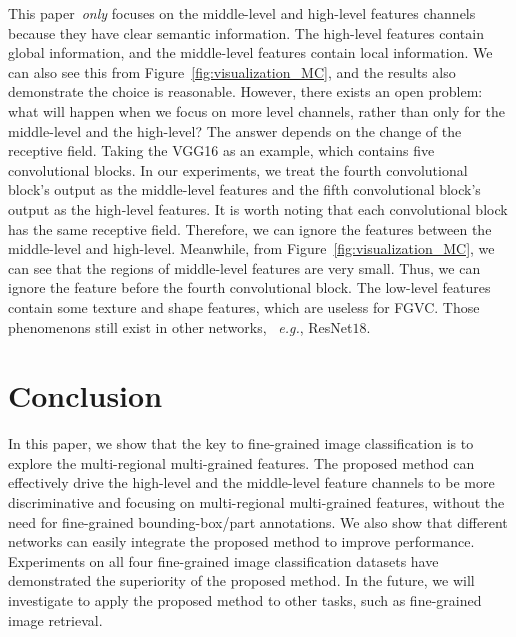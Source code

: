 \documentclass[journal]{IEEEtran}
\begin{document}
This paper~\emph{only} focuses on the middle-level and high-level features channels because they have clear semantic information. The high-level features contain global information, and the middle-level features contain local information. We can also see this from Figure~\ref{fig:visualization_MC}, and the results also demonstrate the choice is reasonable.  However, there exists an open problem: what will happen when we focus on more level channels, rather than only for the middle-level and the high-level? The answer depends on the change of the receptive field. Taking the VGG16 as an example, which contains five convolutional blocks. In our experiments, we treat the fourth convolutional block's output as the middle-level features and the fifth convolutional block's output as the high-level features. It is worth noting that each convolutional block has the same receptive field. Therefore, we can ignore the features between the middle-level and high-level. Meanwhile, from Figure~\ref{fig:visualization_MC}, we can see that the regions of middle-level features are very small. Thus, we can ignore the feature before the fourth convolutional block. The low-level features contain some texture and shape features, which are useless for FGVC. Those phenomenons still exist in other networks, ~\emph{e.g.}, ResNet$18$.

\section{Conclusion}
In this paper, we show that the key to fine-grained image classification is to explore the multi-regional multi-grained features. The proposed method can effectively drive the high-level and the middle-level feature channels to be more discriminative and focusing on multi-regional multi-grained features, without the need for fine-grained bounding-box/part annotations. We also show that different networks can easily integrate the proposed method to improve performance. Experiments on all four fine-grained image classification datasets have demonstrated the superiority of the proposed method. In the future, we will investigate to apply the proposed method to other tasks, such as fine-grained image retrieval.





\end{document}

